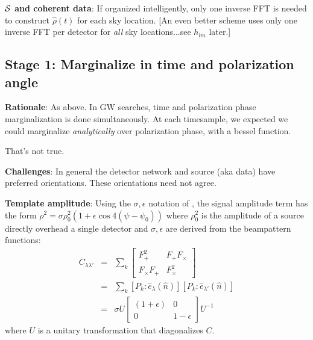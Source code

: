 \documentclass[twocolumn,prd,nofootinbib]{revtex4}
\begin{document}
{\begin{shaded}
\noindent \textbf{${\cal S}$ and coherent data}:  If organized intelligently, only one inverse FFT is needed to
construct $\hat{\rho}(t)$ for each sky location.  [An even better scheme uses only one inverse FFT per detector for
  \emph{all} sky locations...see $h_{lm}$ later.]

\end{shaded}


\subsection{Stage 1: Marginalize in time and polarization angle}

\noindent \textbf{Rationale}: As above.
%
In GW searches, time and polarization phase marginalization is done simultaneously.  At each timesample, we expected we could
 marginalize \emph{analytically} over polarization phase, with a bessel function.

That's not true.

\noindent \textbf{Challenges}: In general the detector network and source (aka data) have preferred orientations.  These
orientations need not agree.  
\begin{shaded}
\noindent \textbf{Template amplitude}: Using the $\sigma,\epsilon$ notation of \citet{CutlerFlanagan:1994}, the signal amplitude term has the form $\rho^2 = \sigma
\rho_0^2(1+\epsilon \cos 4(\psi-\psi_0))$ where $\rho_0^2$ is the amplitude of a source directly overhead a single
detector and $\sigma,\epsilon$ are derived from the beampattern functions:
\begin{eqnarray}
C_{\lambda \lambda'}&=& \sum_k \begin{bmatrix}
F_+^2 & F_+F_\times \\
F_\times F_+ & F_\times^2
\end{bmatrix}\\
&=& \sum_k [P_k : \hat{e}_\lambda(\hat{n})] [P_k : \hat{e}_{\lambda'}(\hat{n})]  \nonumber \\
& =& \sigma U\begin{bmatrix} (1+\epsilon) & 0 \\ 0 & 1-\epsilon \end{bmatrix} U^{-1} 
\end{eqnarray}
where $U$ is a unitary transformation that diagonalizes $C$.


\end{shaded}}
\end{document}
